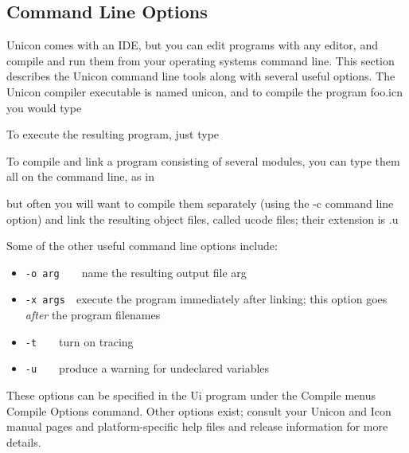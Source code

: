 \subsection{Command Line Options}

Unicon comes with an IDE, but you can edit programs with any
editor, and compile and run them from your operating
system{\textquotesingle}s command line. This section describes the
Unicon command line tools along with several useful options. The Unicon
compiler executable is named unicon, and to compile the program foo.icn
you would type


\noindent To execute the resulting program, just type


To compile and link a program consisting of several modules, you can
type them all on the command line, as in


\noindent but often you will want to compile them separately
(using the -c command line option) and link the resulting object
files, called ucode files; their extension is .u


Some of the other useful command line options include:

\begin{itemize}
\item \texttt{{}-o arg}\ \ \ \ name the resulting output file arg
\item \texttt{{}-x args}\ \ execute the program immediately after linking;
		 this option goes \textit{after} the program filenames
\item \texttt{{}-t}\ \ \ \ turn on tracing
\item \texttt{{}-u}\ \ \ \ produce a warning for undeclared variables
\end{itemize}

These options can be specified in the Ui program under the Compile
menu{\textquotesingle}s Compile Options command. Other options exist;
consult your Unicon and Icon manual pages and platform-specific help
files and release information for more details.

